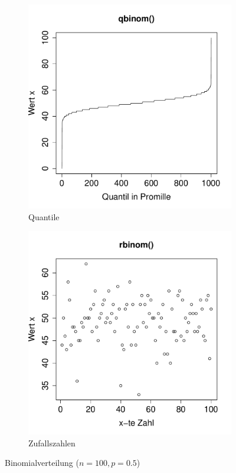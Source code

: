 \begin{figure}[h!]
\begin{subfigure}[b]{0.48\textwidth}
\includegraphics{verteilungen-012}
\caption{Quantile}
\end{subfigure}
\begin{subfigure}[b]{0.48\textwidth}
\includegraphics{verteilungen-013}
\caption{Zufallszahlen}
\end{subfigure}
\caption{Binomialverteilung ($n=100, p=0.5$)}
\label{fig:binom}
\end{figure}

